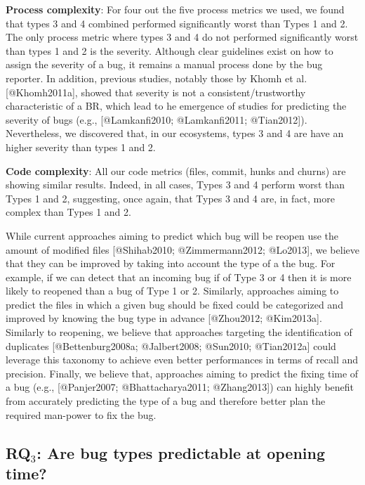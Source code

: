 \textbf{Process complexity}: For four out the five process metrics we
used, we found that types 3 and 4 combined performed significantly worst
than Types 1 and 2. The only process metric where types 3 and 4 do not
performed significantly worst than types 1 and 2 is the severity.
Although clear guidelines exist on how to assign the severity of a bug,
it remains a manual process done by the bug reporter. In addition,
previous studies, notably those by Khomh et al. {[}@Khomh2011a{]},
showed that severity is not a consistent/trustworthy characteristic of a
BR, which lead to he emergence of studies for predicting the severity of
bugs (e.g., {[}@Lamkanfi2010; @Lamkanfi2011; @Tian2012{]}).
Nevertheless, we discovered that, in our ecosystems, types 3 and 4 are
have an higher severity than types 1 and 2.

\textbf{Code complexity}: All our code metrics (files, commit, hunks and
churns) are showing similar results. Indeed, in all cases, Types 3 and 4
perform worst than Types 1 and 2, suggesting, once again, that Types 3
and 4 are, in fact, more complex than Types 1 and 2.

While current approaches aiming to predict which bug will be reopen use
the amount of modified files {[}@Shihab2010; @Zimmermann2012;
@Lo2013{]}, we believe that they can be improved by taking into account
the type of a the bug. For example, if we can detect that an incoming
bug if of Type 3 or 4 then it is more likely to reopened than a bug of
Type 1 or 2. Similarly, approaches aiming to predict the files in which
a given bug should be fixed could be categorized and improved by knowing
the bug type in advance {[}@Zhou2012; @Kim2013a{]}. Similarly to
reopening, we believe that approaches targeting the identification of
duplicates {[}@Bettenburg2008a; @Jalbert2008; @Sun2010; @Tian2012a{]}
could leverage this taxonomy to achieve even better performances in
terms of recall and precision. Finally, we believe that, approaches
aiming to predict the fixing time of a bug (e.g., {[}@Panjer2007;
@Bhattacharya2011; @Zhang2013{]}) can highly benefit from accurately
predicting the type of a bug and therefore better plan the required
man-power to fix the bug.

\subsection{\texorpdfstring{RQ\(_3\): Are bug types predictable at
opening
time?}{RQ\_3: Are bug types predictable at opening time?}}\label{rqux5f3-are-bug-types-predictable-at-opening-time}

